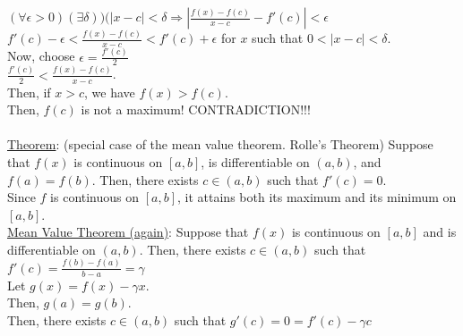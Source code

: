 \documentclass[11pt]{article}
\begin{document}
	$(\forall \epsilon > 0)(\exists \delta))(|x - c| < \delta \Rightarrow
	|\frac{f(x) - f(c)}{x-c} - f'(c)| < \epsilon$\\
	$f'(c) - \epsilon < \frac{f(x) - f(c)}{x - c} < f'(c) + \epsilon$ for
	$x$ such that $ 0 < |x - c| < \delta$.\\
	Now, choose $\epsilon = \frac{f'(c)}{2}$\\
	$\frac{f'(c)}{2} < \frac{f(x) - f(c)}{x - c}$.\\
	Then, if $x > c$, we have $f(x) > f(c)$.\\
	Then, $f(c)$ is not a maximum! CONTRADICTION!!!\\\\
	\underline{Theorem}: (special case of the mean value theorem. Rolle's 
	Theorem) Suppose that $f(x)$ is continuous on $[a,b]$,  is differentiable
	on $(a,b)$, and $f(a) = f(b)$. Then, there exists $c \in (a,b)$ such that 
	$f'(c) = 0$.\\
	Since $f$ is continuous on $[a,b]$, it attains both its maximum and its
	minimum on $[a,b]$.\\
	\underline{Mean Value Theorem (again)}: Suppose that $f(x)$ is continuous
	on $[a,b]$ and is differentiable on $(a,b)$. Then, there exists $c \in
	(a,b)$ such that $f'(c) = \frac{f(b)-f(a)}{b-a} = \gamma$\\
	Let $g(x) = f(x) - \gamma x$.\\
	Then, $g(a) = g(b)$. \\
	Then, there exists $c \in (a,b)$ such that $g'(c) = 0 = f'(c) - \gamma c$
\end{document}
